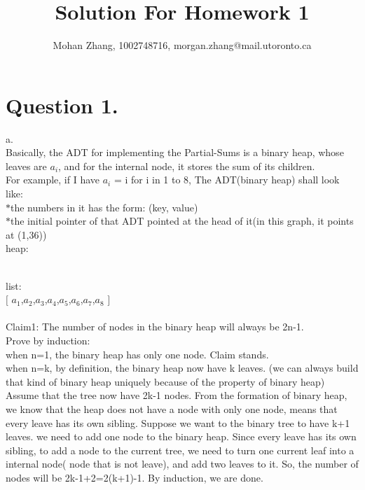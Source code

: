 \documentclass{article}
\title{Solution For Homework 1}
\author{Mohan Zhang, 1002748716, morgan.zhang@mail.utoronto.ca}
\begin{document}
\maketitle

\section{Question 1.}
a.\\
Basically, the ADT for implementing the Partial-Sums is a binary heap, whose leaves are $a_i$, and for the internal node, it stores the sum of its children. \\
For example, if I have $a_i$ = i for i in 1 to 8, The ADT(binary heap) shall look like:\\
$*$the numbers in it has the form: (key, value)\\
$*$the initial pointer of that ADT pointed at the head of it(in this graph, it points at (1,36))\\
heap:\\
\\
list:\\
$[$ $a_1$,$a_2$,$a_3$,$a_4$,$a_5$,$a_6$,$a_7$,$a_8$ $]$\\
\\Claim1: The number of nodes in the binary heap will always be 2n-1.\\
Prove by induction:\\
when n=1, the binary heap has only one node. Claim stands.\\
when n=k, by definition, the binary heap now have k leaves. (we can always build that kind of binary heap uniquely because of the property of binary heap) Assume that the tree now have 2k-1 nodes. From the formation of binary heap, we know that the heap does not have a node with only one node, means that every leave has its own sibling. Suppose we want to the binary tree to have k+1 leaves. we need to add one node to the binary heap. Since every leave has its own sibling, to add a node to the current tree, we need to turn one current leaf into a internal node( node that is not leave), and add two leaves to it. So, the number of nodes will be 2k-1+2=2(k+1)-1. By induction, we are done.\\
\end{document}
